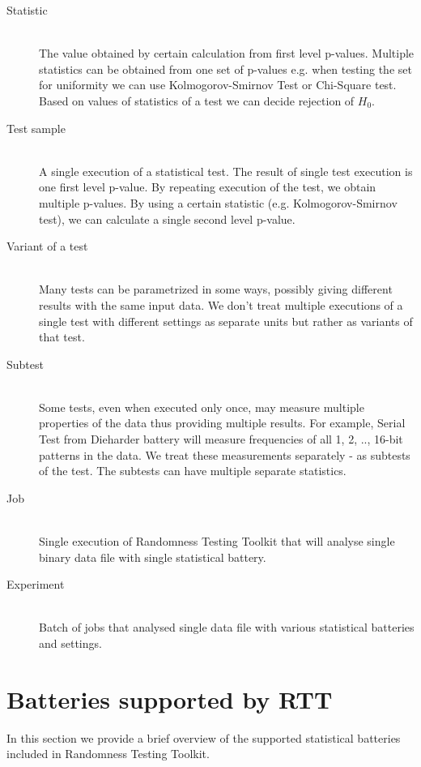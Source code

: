 \documentclass[
	digital,    %
	oneside,    %
	color,
	11pt,
	nocover,
	notable,
	nolof,
	nolot,
]{fithesis3}
\theoremstyle{definition}
\theoremstyle{remark}
\begin{document}
\begin{description}
\item[Statistic] \hfill \\
The value obtained by certain calculation from first level p-values. Multiple statistics can be obtained from one set of p-values e.g. when testing the set for uniformity we can use Kolmogorov-Smirnov Test or Chi-Square test. Based on values of statistics of a test we can decide rejection of $H_0$.

\item[Test sample] \hfill \\
A single execution of a statistical test. The result of single test execution is one first level p-value. By repeating execution of the test, we obtain multiple p-values. By using a certain statistic (e.g. Kolmogorov-Smirnov test), we can calculate a single second level p-value.

\item[Variant of a test] \hfill \\
Many tests can be parametrized in some ways, possibly giving different results with the same input data. We don't treat multiple executions of a single test with different settings as separate units but rather as variants of that test.

\item[Subtest] \hfill \\
Some tests, even when executed only once, may measure multiple properties of the data thus providing multiple results. For example, Serial Test from Dieharder battery will measure frequencies of all 1, 2, .., 16-bit patterns in the data. We treat these measurements separately - as subtests of the test. The subtests can have multiple separate statistics.

\item[Job] \hfill \\
Single execution of Randomness Testing Toolkit that will analyse single binary data file with single statistical battery.

\item[Experiment] \hfill \\
Batch of jobs that analysed single data file with various statistical batteries and settings.

\end{description}

\section{Batteries supported by RTT}
In this section we provide a brief overview of the supported statistical batteries included in Randomness Testing Toolkit.
\end{document}
